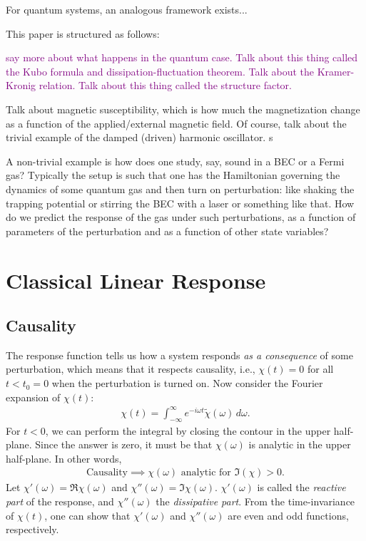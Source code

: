 \documentclass[reprint,
nofootinbib,
amsmath,amssymb,
aps]{revtex4-1}
\begin{document}
For quantum systems, an analogous framework exists...


This paper is structured as follows: 

\textcolor{purple}{say more about what happens in the quantum case. Talk about this thing called the Kubo formula and dissipation-fluctuation theorem. Talk about the Kramer-Kronig relation. Talk about this thing called the structure factor.}

Talk about magnetic susceptibility, which is how much the magnetization change as a function of the applied/external magnetic field. Of course, talk about the trivial example of the damped (driven) harmonic oscillator. s

A non-trivial example is how does one study, say, sound in a BEC or a Fermi gas? Typically the setup is such that one has the Hamiltonian governing the dynamics of some quantum gas and then turn on perturbation: like shaking the trapping potential or stirring the BEC with a laser or something like that. How do we predict the response of the gas under such perturbations, as a function of parameters of the perturbation and as a function of other state variables? 



\section{Classical Linear Response}


\subsection{Causality}

The response function tells us how a system responds \textit{as a consequence} of some perturbation, which means that it respects causality, i.e., $\chi(t) = 0$ for all $t < t_0 = 0$ when the perturbation is turned on. Now consider the Fourier expansion of $\chi(t)$:
\begin{align*}
\chi(t) = \int_{-\infty}^\infty  e^{-i\omega t } \tilde{\chi}(\omega) \,d\omega.
\end{align*}
For $t<0$, we can perform the integral by closing the contour in the upper half-plane. Since the answer is zero, it must be that $\chi(\omega)$ is analytic in the upper half-plane. In other words, 
\begin{align*}
\text{Causality} \implies \chi(\omega) \text{ analytic for } \Im(\chi) > 0.
\end{align*}
Let $\chi'(\omega) = \Re \chi(\omega)$ and $\chi''(\omega) = \Im \chi(\omega)$. $\chi'(\omega)$ is called the \textit{reactive part} of the response, and $\chi''(\omega)$ the \textit{dissipative part}. From the time-invariance of $\chi(t)$, one can show that $\chi'(\omega)$ and $\chi''(\omega)$ are even and odd functions, respectively.
\end{document}
